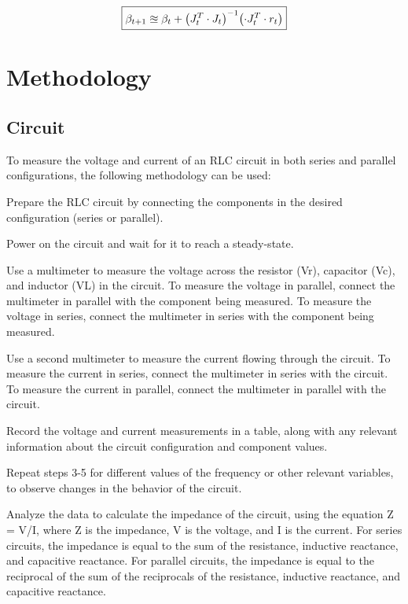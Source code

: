 \documentclass[12pt,twoside]{extarticle}
\begin{document}
\begin{equation}
    \boxed{
    \beta_{t+1} \approxeq \beta_t + \qty(J_t^T\cdot J_t)^{-1}\qty(\cdot J^T_t \cdot r_t)
    }
\end{equation}

\section{Methodology}
\subsection{Circuit}
To measure the voltage and current of an RLC circuit in both series and parallel configurations, the following methodology can be used:

Prepare the RLC circuit by connecting the components in the desired configuration (series or parallel).

Power on the circuit and wait for it to reach a steady-state.

Use a multimeter to measure the voltage across the resistor (Vr), capacitor (Vc), and inductor (VL) in the circuit. To measure the voltage in parallel, connect the multimeter in parallel with the component being measured. To measure the voltage in series, connect the multimeter in series with the component being measured.

Use a second multimeter to measure the current flowing through the circuit. To measure the current in series, connect the multimeter in series with the circuit. To measure the current in parallel, connect the multimeter in parallel with the circuit.

Record the voltage and current measurements in a table, along with any relevant information about the circuit configuration and component values.

Repeat steps 3-5 for different values of the frequency or other relevant variables, to observe changes in the behavior of the circuit.

Analyze the data to calculate the impedance of the circuit, using the equation Z = V/I, where Z is the impedance, V is the voltage, and I is the current. For series circuits, the impedance is equal to the sum of the resistance, inductive reactance, and capacitive reactance. For parallel circuits, the impedance is equal to the reciprocal of the sum of the reciprocals of the resistance, inductive reactance, and capacitive reactance.
\end{document}
